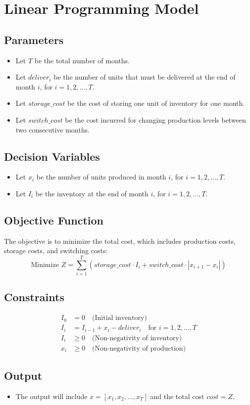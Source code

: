 \documentclass{article}
\begin{document}
\section*{Linear Programming Model}

\subsection*{Parameters}
\begin{itemize}
    \item Let $T$ be the total number of months.
    \item Let $deliver_i$ be the number of units that must be delivered at the end of month $i$, for $i = 1, 2, \ldots, T$.
    \item Let $storage\_cost$ be the cost of storing one unit of inventory for one month.
    \item Let $switch\_cost$ be the cost incurred for changing production levels between two consecutive months.
\end{itemize}

\subsection*{Decision Variables}
\begin{itemize}
    \item Let $x_i$ be the number of units produced in month $i$, for $i = 1, 2, \ldots, T$.
    \item Let $I_i$ be the inventory at the end of month $i$, for $i = 1, 2, \ldots, T$.
\end{itemize}

\subsection*{Objective Function}
The objective is to minimize the total cost, which includes production costs, storage costs, and switching costs:
\[
\text{Minimize } Z = \sum_{i=1}^{T} (storage\_cost \cdot I_i + switch\_cost \cdot |x_{i+1} - x_i|) 
\]

\subsection*{Constraints}
\begin{align*}
I_0 & = 0 \quad \text{(Initial inventory)} \\
I_i & = I_{i-1} + x_i - deliver_i \quad \text{for } i = 1, 2, \ldots, T \\
I_i & \geq 0 \quad \text{(Non-negativity of inventory)} \\
x_i & \geq 0 \quad \text{(Non-negativity of production)}
\end{align*}

\subsection*{Output}
\begin{itemize}
    \item The output will include $x = [x_1, x_2, \ldots, x_T]$ and the total cost $cost = Z$.
\end{itemize}
\end{document}
